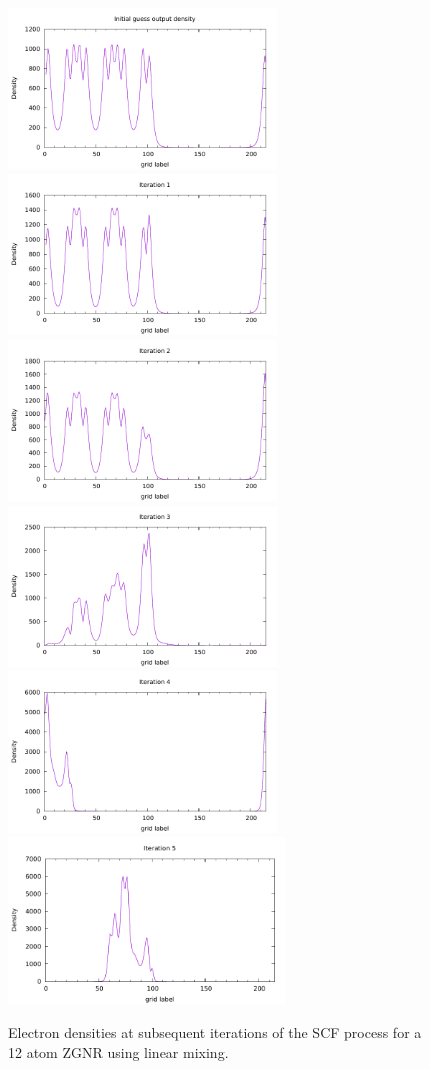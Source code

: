 \begin{figure}
\includegraphics[width=2.8in]{Pictures/slosh1.pdf}
\includegraphics[width=2.8in]{Pictures/slosh2.pdf}
\includegraphics[width=2.8in]{Pictures/slosh3.pdf}
\includegraphics[width=2.8in]{Pictures/slosh4.pdf}
\includegraphics[width=2.8in]{Pictures/slosh5.pdf}
\includegraphics[width=2.9in]{Pictures/slosh6.pdf}
\caption{Electron densities at subsequent iterations of the SCF process for a 12 atom ZGNR using linear mixing.}
\label{sloshing}
\end{figure}

